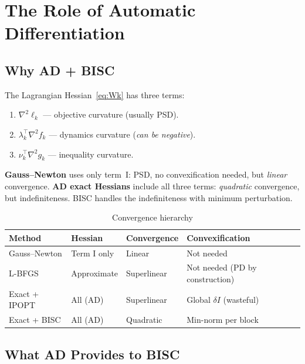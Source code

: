 \documentclass[11pt]{article}
\begin{document}
\section{The Role of Automatic Differentiation}

\subsection{Why AD + BISC}

The Lagrangian Hessian~\eqref{eq:Wk} has three terms:
\begin{enumerate}
  \item[\textbf{I.}] $\nabla^2 \ell_k$ --- objective curvature (usually PSD).
  \item[\textbf{II.}] $\lambda_k^\top \nabla^2 f_k$ --- dynamics curvature (\emph{can be negative}).
  \item[\textbf{III.}] $\nu_k^\top \nabla^2 g_k$ --- inequality curvature.
\end{enumerate}

\textbf{Gauss--Newton} uses only term~I: PSD, no convexification needed, but
\emph{linear} convergence. \textbf{AD exact Hessians} include all three terms:
\emph{quadratic} convergence, but indefiniteness. BISC handles the indefiniteness
with minimum perturbation.

\begin{table}[h]
\centering
\caption{Convergence hierarchy}
\begin{tabular}{llll}
\toprule
\textbf{Method} & \textbf{Hessian} & \textbf{Convergence} & \textbf{Convexification} \\
\midrule
Gauss--Newton         & Term I only   & Linear       & Not needed \\
L-BFGS                & Approximate   & Superlinear  & Not needed (PD by construction) \\
Exact + IPOPT         & All (AD)      & Superlinear  & Global $\delta I$ (wasteful) \\
Exact + BISC          & All (AD)      & Quadratic    & Min-norm per block \\
\bottomrule
\end{tabular}
\end{table}


\subsection{What AD Provides to BISC}
\end{document}
